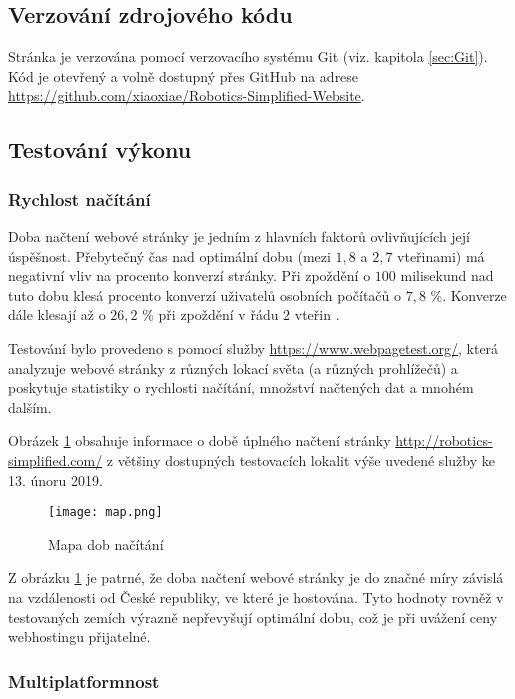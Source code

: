 \documentclass[a4paper, 12pt]{article}
\newcommand*{\fullref}[1]{\hyperref[{#1}]{\ref*{#1}}}
\begin{document}
  \subsection{Verzování zdrojového kódu}
  Stránka je verzována pomocí verzovacího systému Git (viz. kapitola \fullref{sec:Git}). Kód je otevřený a volně dostupný přes GitHub na adrese \url{https://github.com/xiaoxiae/Robotics-Simplified-Website}.


  \subsection{Testování výkonu}

  \subsubsection{Rychlost načítání}
  Doba načtení webové stránky je jedním z hlavních faktorů ovlivňujících její úspěšnost. Přebytečný čas nad optimální dobu (mezi $1,8$ a $2,7$ vteřinami) má negativní vliv na procento konverzí stránky. Při zpoždění o $100$ milisekund nad tuto dobu klesá procento konverzí uživatelů osobních počítačů o $7,8$ \%. Konverze dále klesají až o $26,2$ \% při zpoždění v řádu $2$ vteřin \cite{conversion-rate-statistics}.

  Testování bylo provedeno s pomocí služby \url{https://www.webpagetest.org/}, která analyzuje webové stránky z různých lokací světa (a různých prohlížečů) a poskytuje statistiky o rychlosti načítání, množství načtených dat a mnohém dalším.

  Obrázek \ref{img:Mapa dob načítání} obsahuje informace o době úplného načtení stránky \url{http://robotics-simplified.com/} z většiny dostupných testovacích lokalit výše uvedené služby ke 13. únoru 2019.

  \begin{figure}[H]
    \texttt{[image: map.png]}
    \caption{Mapa dob načítání} \label{img:Mapa dob načítání}
  \end{figure}

  Z obrázku \ref{img:Mapa dob načítání} je patrné, že doba načtení webové stránky je do značné míry závislá na vzdálenosti od České republiky, ve které je hostována. Tyto hodnoty rovněž v testovaných zemích výrazně nepřevyšují optimální dobu, což je při uvážení ceny webhostingu přijatelné.


  \subsubsection{Multiplatformnost}
\end{document}
